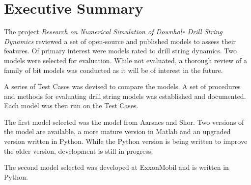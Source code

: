 \chapter*{Executive Summary}

The project \emph{Research on Numerical Simulation of Downhole Drill String Dynamics} reviewed a set of open-source and published models to assess their features.  Of primary interest were models rated to drill string dynamics.  Two models were selected for evaluation.  While not evaluated, a thorough review of a family of bit models was conducted as it will be of interest in the future.

A series of Test Cases was devised to compare the models.  A set of procedures and methods for evaluating drill string models was established and documented.  Each model was then run on the Test Cases.

The first model selected was the model from Aarsnes and Shor.  Two versions of the model are available, a more mature version in Matlab and an upgraded version written in Python.  While the Python version is being written to improve the older version, development is still in progress.

The second model selected was developed at ExxonMobil and is written in Python. 